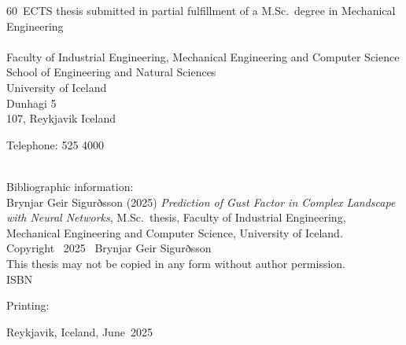 \documentclass[a4paper,12pt,twoside,BCOR=10mm,openany]{scrbook}
\def\thesisyear{2025}       					%
\def\thesismonth{June}					%
\def\thesisauthor{Brynjar Geir Sigurðsson}				%
\def\thesistitle{Prediction of Gust Factor in Complex Landscape with Neural Networks} %
\def\thesiscredits{60} 						%
\def\thesissubject{Mechanical Engineering}
\def\thesiskind{M.Sc.}					%
\def\thesisschool{School of Engineering and {Natural Sciences}}		%
\def\thesisfaculty{Industrial Engineering, Mechanical Engineering and Computer Science}%
\def\thesisaddress{Dunhagi 5}			        %
\def\thesispostalcode{107}			                %
\def\thesistelephone{525 4000}					%
\def\thesisISBN{}           					%
\def\thesisprinting{}						%
\def\thesislicense{This thesis may not be copied in any form without author permission.} %
\newcommand{\removelinebreaks}[1]{%
  \begingroup\def\\{}#1\endgroup}
\begin{document}
\begin{titlepage}
    
  \thesiscredits ~ECTS thesis submitted in partial fulfillment of a \thesiskind{}~degree in \thesissubject
\\ \\
  Faculty of \thesisfaculty \\
  \thesisschool \\
  University of Iceland \\
  \thesisaddress \\ 
  \thesispostalcode, Reykjavik 
  Iceland

  Telephone: \thesistelephone \\ \\ 
  \vspace*{\lineskip}

  Bibliographic information: \\
  \thesisauthor{} (\thesisyear{}) \emph{\removelinebreaks{\thesistitle{}}}, \thesiskind{}~thesis, Faculty of \thesisfaculty, University of Iceland.\\

  Copyright \textcopyright~\thesisyear~ \thesisauthor \\
  \thesislicense{}\\

  \ifx\thesisISBN\empty %
  \else
  ISBN~\thesisISBN
  \fi
  
  \ifx\thesisprinting\empty %
  \else
  Printing: \thesisprinting \\
  \fi


  Reykjavik, Iceland, \thesismonth~\thesisyear \\

\end{titlepage}

\cleardoublepage


\setcounter{page}{5}

\end{document}
